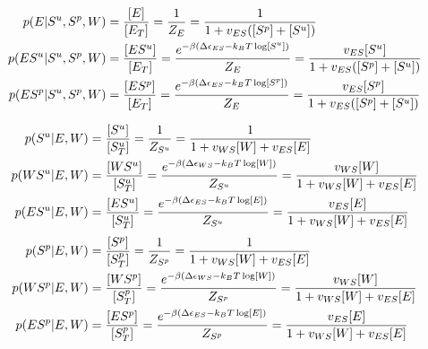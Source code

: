 \documentclass[aps,onecolumn,superscriptaddress,notitlepage]{revtex4-1}
\begin{document}
\begin{align}
p(E|S^u,S^p, W) &= \frac{[E]}{[E_T]} = \frac{1}{Z_E} =  \frac{1}{1 + v_{ES}([S^p]+[S^u])}\\
p(ES^u|S^u,S^p, W) &= \frac{[ES^u]}{[E_T]}  = \frac{e^{-\beta\qty(\Delta\epsilon_{ES} -k_BT \log[S^u])}}{Z_E} =  \frac{v_{ES}[S^u]}{1 + v_{ES}([S^p]+[S^u])}\\
p(ES^p|S^u,S^p, W) &= \frac{[ES^p]}{[E_T]}  = \frac{e^{-\beta\qty(\Delta\epsilon_{ES} -k_BT \log[S^p])}}{Z_E} =  \frac{v_{ES}[S^p]}{1 + v_{ES}([S^p]+[S^u])}
\end{align}

\begin{align}
p(S^u|E, W) &= \frac{[S^u]}{[S^u_T]} = \frac{1}{Z_{S^u}} = \frac{1}{1 + v_{WS}[W]+ v_{ES}[E]}\\
p(WS^u|E, W) &= \frac{[WS^u]}{[S^u_T]} = \frac{ e^{-\beta\qty(\Delta\epsilon_{WS} -k_BT \log[W])}}{Z_{S^u}} = \frac{v_{WS}[W]}{1 + v_{WS}[W]+ v_{ES}[E]}\\
p(ES^u|E, W) &= \frac{[ES^u]}{[S^u_T]} = \frac{ e^{-\beta\qty(\Delta\epsilon_{ES} -k_BT \log[E])}}{Z_{S^u}} = \frac{v_{ES}[E]}{1 + v_{WS}[W]+ v_{ES}[E]}
\end{align}
\begin{align}
p(S^p|E, W) &= \frac{[S^p]}{[S^p_T]} = \frac{1}{Z_{S^p}} = \frac{1}{1 + v_{WS}[W]+ v_{ES}[E]}\\
p(WS^p|E, W) &= \frac{[WS^p]}{[S^p_T]} = \frac{ e^{-\beta\qty(\Delta\epsilon_{WS} -k_BT \log[W])}}{Z_{S^p}} = \frac{v_{WS}[W]}{1 + v_{WS}[W]+ v_{ES}[E]}\\
p(ES^p|E, W) &= \frac{[ES^p]}{[S^p_T]} = \frac{ e^{-\beta\qty(\Delta\epsilon_{ES} -k_BT \log[E])}}{Z_{S^p}} = \frac{v_{ES}[E]}{1 + v_{WS}[W]+ v_{ES}[E]}
\end{align}


\end{document}
